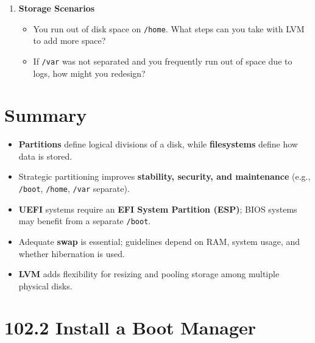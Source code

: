 \documentclass[12pt,a4paper]{report}
\begin{document}
\begin{enumerate}
    \item \textbf{Storage Scenarios}
    \begin{itemize}
        \item You run out of disk space on \texttt{/home}. What steps can you take with LVM to add more space?
        \item If \texttt{/var} was not separated and you frequently run out of space due to logs, how might you redesign?
    \end{itemize}
\end{enumerate}

\section*{Summary}

\begin{itemize}
    \item \textbf{Partitions} define logical divisions of a disk, while \textbf{filesystems} define how data is stored.
    \item Strategic partitioning improves \textbf{stability, security, and maintenance} (e.g., \texttt{/boot}, \texttt{/home}, \texttt{/var} separate).
    \item \textbf{UEFI} systems require an \textbf{EFI System Partition (ESP)}; BIOS systems may benefit from a separate \texttt{/boot}.
    \item Adequate \textbf{swap} is essential; guidelines depend on RAM, system usage, and whether hibernation is used.
    \item \textbf{LVM} adds flexibility for resizing and pooling storage among multiple physical disks.
\end{itemize}





\newpage

\section*{102.2 Install a Boot Manager}
\end{document}
